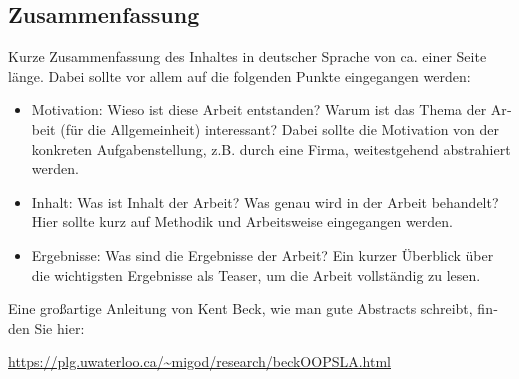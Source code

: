 \begin{otherlanguage}{ngerman}
	\chapter*{Zusammenfassung}
	Kurze Zusammenfassung des Inhaltes in deutscher Sprache von ca. einer Seite länge. Dabei sollte vor allem auf die folgenden Punkte eingegangen werden:
	\begin{itemize}
	  \item Motivation: Wieso ist diese Arbeit entstanden? Warum ist das Thema der Arbeit (für die Allgemeinheit) interessant? Dabei sollte die Motivation von der konkreten Aufgabenstellung, z.B. durch eine Firma, weitestgehend abstrahiert werden. 
          \item Inhalt: Was ist Inhalt der Arbeit? Was genau wird in der Arbeit behandelt? Hier sollte kurz auf Methodik und Arbeitsweise eingegangen werden.
          \item Ergebnisse: Was sind die Ergebnisse der Arbeit? Ein kurzer Überblick über die wichtigsten Ergebnisse als Teaser, um die Arbeit vollständig zu lesen.
	\end{itemize}
	\medskip

	\noindent
	Eine großartige Anleitung von Kent Beck, wie man gute Abstracts schreibt, finden Sie hier:
	\begin{center}
                \url{https://plg.uwaterloo.ca/~migod/research/beckOOPSLA.html}
        \end{center}

\end{otherlanguage}
